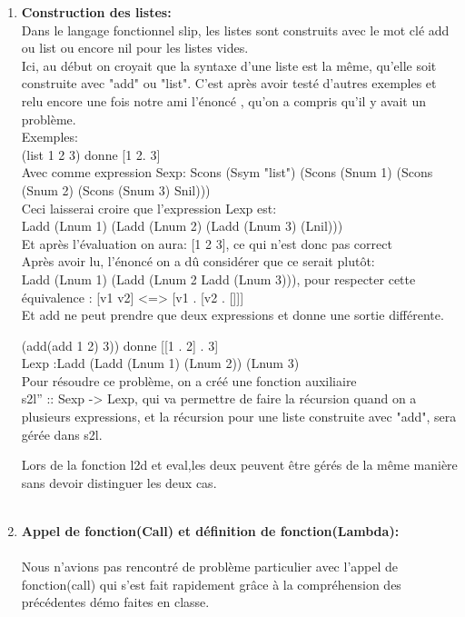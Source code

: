 \documentclass{article}
\begin{document}
\begin{enumerate}
    \item 
    \textbf{Construction des listes:}\\
    Dans le langage fonctionnel slip, les listes sont construits avec le mot clé add ou list ou encore nil pour les listes vides.\\
    Ici, au début on croyait que la syntaxe d'une liste est la même, qu'elle soit construite avec "add" ou "list". C'est après avoir testé d'autres exemples et relu encore une fois notre ami l'énoncé , qu'on a compris qu'il y avait un problème.\\
    Exemples:\\
      
      (list 1 2 3) donne  [1 2. 3]\\
      Avec comme expression Sexp: Scons (Ssym "list") (Scons (Snum 1) (Scons (Snum 2) (Scons (Snum 3) Snil)))\\
      
      Ceci laisserai croire que l'expression Lexp est:\\ Ladd (Lnum 1) (Ladd (Lnum 2) (Ladd (Lnum 3) (Lnil)))\\
      
      Et après l'évaluation on aura: [1 2 3], ce qui n'est donc pas correct\\
      
     Après avoir lu, l'énoncé on a dû considérer que ce serait plutôt:\\
      Ladd (Lnum 1) (Ladd (Lnum 2 Ladd (Lnum 3))), pour respecter cette équivalence : [v1 v2] <=>  [v1 . [v2 . []]]\\
      
     Et add ne peut prendre que deux expressions et donne une sortie différente.
    
    (add(add 1 2) 3)) donne [[1 . 2] . 3] \\Lexp :Ladd (Ladd (Lnum 1) (Lnum 2)) (Lnum 3) \\
    
    Pour résoudre ce problème, on a créé une fonction auxiliaire\\
    s2l'' :: Sexp -> Lexp, qui va permettre de faire la récursion quand on a plusieurs expressions, et la récursion pour une liste construite avec "add", sera gérée dans s2l.
    
    Lors de la fonction l2d et eval,les deux peuvent être gérés de la même manière sans devoir distinguer les deux cas.\\
    \\
\item
     \textbf{Appel de fonction(Call) et définition de fonction(Lambda):}\\ 
    \\
    Nous n’avions pas rencontré de problème particulier avec l’appel de fonction(call) qui s’est fait rapidement grâce à la compréhension des précédentes démo faites en classe.\\
    

\end{enumerate}
\end{document}
